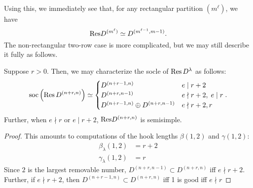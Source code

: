 \documentclass{amsart}
\begin{document}
  Using this, we immediately see that, for any rectangular partition $(m^\ell)$, we have
  \[
    \text{Res} D^{(m^\ell)} \simeq D^{(m^{\ell-1},m-1)}.
  \]
  The non-rectangular two-row case is more complicated, but we may still describe it fully as follows.
  \begin{corollary}\label{D Restrictions}
    Suppose $r > 0$.
    Then, we may characterize the socle of $\text{Res} \, D^\lambda$ as follows:
    \[
      \text{soc}\left( \text{Res} \, D^{(n+r,n)} \right) \simeq \begin{cases}
        D^{(n + r - 1,n)} & e \mid r+2\\
        D^{(n + r,n-1)} & e \nmid r+2, \; e \mid r\\
        D^{(n+r-1,n)} \oplus D^{(n+r,n-1)} & e \nmid r+2,r
      \end{cases}.
    \]
    Further, when $e \nmid r$ or $e \mid r + 2$, $\text{Res} D^{(n+r,n)}$ is semisimple.
  \end{corollary}
  \begin{proof}
    This amounts to computations of the hook lengths $\beta(1,2)$ and $\gamma(1,2)$:
    \begin{align*}
      \beta_\lambda(1,2) &= r + 2\\
      \gamma_\lambda(1,2) &= r
    \end{align*}
    Since $2$ is the largest removable number, $D^{(n+r,n-1)} \subset D^{(n+r,n)}$ iff $e \nmid r + 2$.
    Further, if $e \nmid r + 2$, then $D^{(n+r-1,n)} \subset D^{(n+r,n)}$ iff 1 is good iff $e \nmid r$
  \end{proof}
\end{document}
